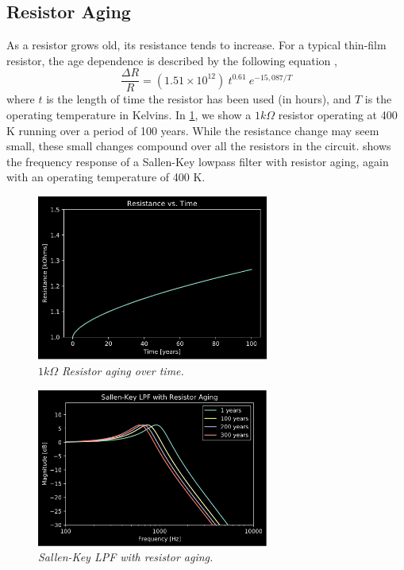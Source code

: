 \documentclass[twoside,a4paper]{article}
\begin{document}
\subsection{Resistor Aging} \label{sec:res-age}
%
As a resistor grows old, its resistance tends to increase. For a typical
thin-film resistor, the age dependence is described by the following
equation \cite{thermal_resistors},
%
\begin{equation}
    \frac{\Delta R}{R} = (1.51 \times 10^{12})\ 
    t^{0.61}\  e^{- 15,087 / T}    
    \label{eq:resistor-age}
\end{equation}
%
where $t$ is the length of time the resistor has been used (in hours), and
$T$ is the operating temperature in Kelvins. In \cref{res-age}, we show
a $1 k\Omega$ resistor operating at 400 K running over a period of 100
years. While the resistance change may seem small, these small changes
compound over all the resistors in the circuit. \Cref{res-age-freq} shows
the frequency response of a Sallen-Key lowpass filter with resistor aging,
again with an operating temperature of 400 K.
%
\begin{figure}[!htb]
    \center
    \includegraphics[width=3in]{../CMAging/Pics/r_time.png}
    \caption{\label{res-age}{\it $1 k\Omega$ Resistor aging over time.}}
\end{figure}
%
\begin{figure}[!htb]
    \center
    \includegraphics[width=3in]{../CMAging/Pics/r_freq.png}
    \caption{\label{res-age-freq}{\it Sallen-Key LPF with resistor aging.}}
\end{figure}
%
\end{document}
